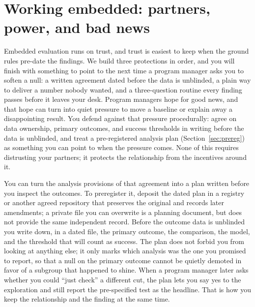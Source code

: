 \documentclass[
    a4paper,
    fontsize=10pt,
    twoside=true,
    numbers=noenddot,
]{kaobook}
\begin{document}
\section{Working embedded: partners, power, and bad news}\label{sec:literacy}
Embedded evaluation runs on trust, and trust is easiest to keep when the ground rules pre-date the findings. We build three protections in order, and you will finish with something to point to the next time a program manager asks you to soften a null: a written agreement dated before the data is unblinded, a plain way to deliver a number nobody wanted, and a three-question routine every finding passes before it leaves your desk. Program managers hope for good news, and that hope can turn into quiet pressure to move a baseline or explain away a disappointing result. You defend against that pressure procedurally: agree on data ownership, primary outcomes, and success thresholds in writing before the data is unblinded, and treat a pre-registered analysis plan (Section~\ref{sec:prereg}) as something you can point to when the pressure comes. None of this requires distrusting your partners; it protects the relationship from the incentives around it.

You can turn the analysis provisions of that agreement into a plan written before you inspect the outcomes. To preregister it, deposit the dated plan in a registry or another agreed repository that preserves the original and records later amendments; a private file you can overwrite is a planning document, but does not provide the same independent record. Before the outcome data is unblinded you write down, in a dated file, the primary outcome, the comparison, the model, and the threshold that will count as success. The plan does not forbid you from looking at anything else; it only marks which analysis was the one you promised to report, so that a null on the primary outcome cannot be quietly demoted in favor of a subgroup that happened to shine. When a program manager later asks whether you could \enquote{just check} a different cut, the plan lets you say yes to the exploration and still report the pre-specified test as the headline. That is how you keep the relationship and the finding at the same time.
\end{document}
